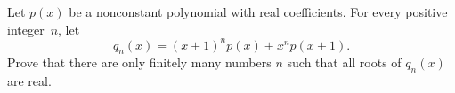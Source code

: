 Let $p(x)$ be a nonconstant polynomial with real coefficients. For every positive integer~$n$, let $$q_n(x) = (x+1)^np(x)+x^n p(x+1) .$$
Prove that there are only finitely many numbers $n$ such that all roots of $q_n(x)$ are real.